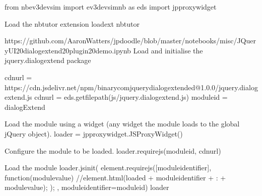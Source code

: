 \documentclass[letterpaper,10pt,english]{sphinxmanual}
\begin{document}
{
\begin{sphinxVerbatim}[commandchars=\\\{\}]
\llap{\color{nbsphinxin}[ ]:\,\hspace{\fboxrule}\hspace{\fboxsep}}from nbev3devsim import ev3devsim\PYGZus{}nb as eds
import jp\PYGZus{}proxy\PYGZus{}widget

\PYGZsh{}Load the nbtutor extension
\PYGZpc{}load\PYGZus{}ext nbtutor

\PYGZsh{}https://github.com/AaronWatters/jp\PYGZus{}doodle/blob/master/notebooks/misc/JQueryUI\PYGZpc{}20dialogextend\PYGZpc{}20plugin\PYGZpc{}20demo.ipynb
\PYGZsh{}Load and initialise the jquery.dialogextend package

cdn\PYGZus{}url = \PYGZdq{}https://cdn.jsdelivr.net/npm/binary\PYGZhy{}com\PYGZhy{}jquery\PYGZhy{}dialogextended@1.0.0/jquery.dialogextend.js\PYGZdq{}
cdn\PYGZus{}url = eds.get\PYGZus{}file\PYGZus{}path(\PYGZsq{}js/jquery.dialogextend.js\PYGZsq{})
module\PYGZus{}id = \PYGZdq{}dialogExtend\PYGZdq{}

\PYGZsh{} Load the module using a widget (any widget \PYGZhy{}\PYGZhy{} the module loads to the global jQuery object).
loader = jp\PYGZus{}proxy\PYGZus{}widget.JSProxyWidget()

\PYGZsh{} Configure the module to be loaded.
loader.require\PYGZus{}js(module\PYGZus{}id, cdn\PYGZus{}url)

\PYGZsh{} Load the module
loader.js\PYGZus{}init(\PYGZdq{}\PYGZdq{}\PYGZdq{}
    element.requirejs([module\PYGZus{}identifier], function(module\PYGZus{}value) \PYGZob{}
        //element.html(\PYGZdq{}loaded \PYGZdq{} + module\PYGZus{}identifier + \PYGZdq{} : \PYGZdq{} + module\PYGZus{}value);
    \PYGZcb{});
\PYGZdq{}\PYGZdq{}\PYGZdq{}, module\PYGZus{}identifier=module\PYGZus{}id)
loader
\end{sphinxVerbatim}
}
\end{document}

